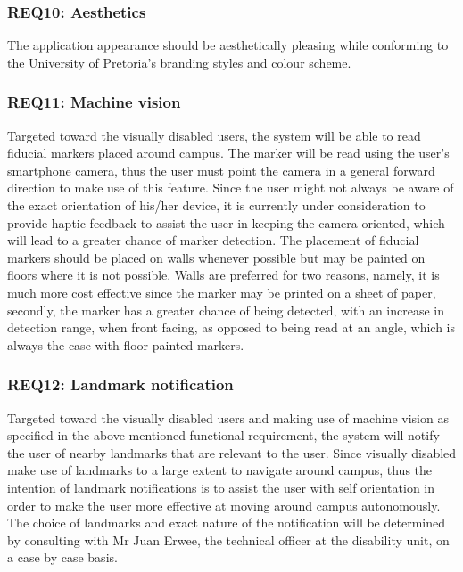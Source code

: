 		\subsubsection{REQ10: Aesthetics}
			The application appearance should be aesthetically pleasing while conforming to the University of Pretoria's branding styles and colour scheme.

		\subsubsection{REQ11: Machine vision}
			Targeted toward the visually disabled users, the system will be able to read fiducial markers placed around campus. The marker will be read using the user's smartphone camera, thus the user must point the camera in a general forward direction to make use of this feature. Since the user might not always be aware of the exact orientation of his/her device, it is currently under consideration to provide haptic feedback to assist the user in keeping the camera oriented, which will lead to a greater chance of marker detection. The placement of fiducial markers should be placed on walls whenever possible but may be painted on floors where it is not possible. Walls are preferred for two reasons, namely, it is much more cost effective since the marker may be printed on a sheet of paper, secondly, the marker has a greater chance of being detected, with an increase in detection range, when front facing, as opposed to being read at an angle, which is always the case with floor painted markers.

		\subsubsection{REQ12: Landmark notification}
			Targeted toward the visually disabled users and making use of machine vision as specified in the above mentioned functional requirement, the system will notify the user of nearby landmarks that are relevant to the user. Since visually disabled make use of landmarks to a large extent to navigate around campus, thus the intention of landmark notifications is to assist the user with self orientation in order to make the user more effective at moving around campus autonomously. The choice of landmarks and exact nature of the notification will be determined by consulting with Mr Juan Erwee, the technical officer at the disability unit, on a case by case basis.

